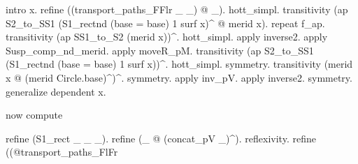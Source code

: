\begin{coqdoccode}
\begin{coqdoccomment}
\coqdoceol
\coqdocindent{1.00em}
intro\coqdocindent{0.50em}
x.\coqdoceol
\coqdocindent{2.00em}
refine\coqdocindent{0.50em}
((transport\_paths\_FFlr\coqdocindent{0.50em}
\_\coqdocindent{0.50em}
\_)\coqdocindent{0.50em}
@\coqdocindent{0.50em}
\_).\coqdocindent{0.50em}
hott\_simpl.\coqdoceol
\coqdocindent{2.00em}
transitivity\coqdocindent{0.50em}
(ap\coqdocindent{0.50em}
S2\_to\_SS1\coqdocindent{0.50em}
(S1\_rectnd\coqdocindent{0.50em}
(base\coqdocindent{0.50em}
=\coqdocindent{0.50em}
base)\coqdocindent{0.50em}
1\coqdocindent{0.50em}
surf\coqdocindent{0.50em}
x)\^{}\coqdocindent{0.50em}
@\coqdocindent{0.50em}
merid\coqdocindent{0.50em}
x).\coqdoceol
\coqdocindent{2.00em}
repeat\coqdocindent{0.50em}
f\_ap.\coqdoceol
\coqdocindent{2.00em}
transitivity\coqdocindent{0.50em}
(ap\coqdocindent{0.50em}
SS1\_to\_S2\coqdocindent{0.50em}
(merid\coqdocindent{0.50em}
x))\^{}.\coqdocindent{0.50em}
hott\_simpl.\coqdoceol
\coqdocindent{2.00em}
apply\coqdocindent{0.50em}
inverse2.\coqdoceol
\coqdocindent{2.00em}
apply\coqdocindent{0.50em}
Susp\_comp\_nd\_merid.\coqdoceol
\coqdocindent{2.00em}
apply\coqdocindent{0.50em}
moveR\_pM.\coqdoceol
\coqdocindent{2.00em}
transitivity\coqdocindent{0.50em}
(ap\coqdocindent{0.50em}
S2\_to\_SS1\coqdocindent{0.50em}
(S1\_rectnd\coqdocindent{0.50em}
(base\coqdocindent{0.50em}
=\coqdocindent{0.50em}
base)\coqdocindent{0.50em}
1\coqdocindent{0.50em}
surf\coqdocindent{0.50em}
x))\^{}.\coqdocindent{0.50em}
hott\_simpl.\coqdoceol
\coqdocindent{2.00em}
symmetry.\coqdocindent{0.50em}
transitivity\coqdocindent{0.50em}
(merid\coqdocindent{0.50em}
x\coqdocindent{0.50em}
@\coqdocindent{0.50em}
(merid\coqdocindent{0.50em}
Circle.base)\^{})\^{}.\coqdoceol
\coqdocindent{2.00em}
symmetry.\coqdocindent{0.50em}
apply\coqdocindent{0.50em}
inv\_pV.\coqdocindent{0.50em}
apply\coqdocindent{0.50em}
inverse2.\coqdocindent{0.50em}
symmetry.\coqdoceol
\coqdocindent{1.00em}
generalize\coqdocindent{0.50em}
dependent\coqdocindent{0.50em}
x.\coqdoceol
\coqdoceol
\coqdocindent{1.00em}
\begin{coqdoccomment}
\coqdocindent{0.50em}
now\coqdocindent{0.50em}
compute\coqdocindent{0.50em}
\end{coqdoccomment}
\coqdoceol
\coqdocindent{1.00em}
refine\coqdocindent{0.50em}
(S1\_rect\coqdocindent{0.50em}
\_\coqdocindent{0.50em}
\_\coqdocindent{0.50em}
\_).\coqdoceol
\coqdocindent{1.00em}
refine\coqdocindent{0.50em}
(\_\coqdocindent{0.50em}
@\coqdocindent{0.50em}
(concat\_pV\coqdocindent{0.50em}
\_)\^{}).\coqdocindent{0.50em}
reflexivity.\coqdoceol
\coqdocindent{1.00em}
refine\coqdocindent{0.50em}
((@transport\_paths\_FlFr\coqdocindent{0.50em}

\end{coqdoccomment}
\end{coqdoccode}
